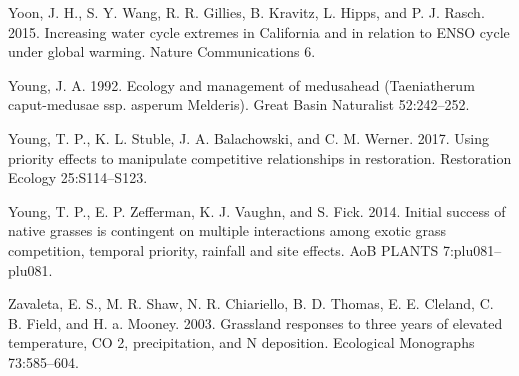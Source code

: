 \documentclass[twoside,12pt,final]{ucthesis-CA2012}
\begin{document}
\begin{ucmainmatter}
\leavevmode\hypertarget{ref-Yoon2015}{}%
Yoon, J. H., S. Y. Wang, R. R. Gillies, B. Kravitz, L. Hipps, and P. J. Rasch. 2015. Increasing water cycle extremes in California and in relation to ENSO cycle under global warming. Nature Communications 6.

\leavevmode\hypertarget{ref-Young1992}{}%
Young, J. A. 1992. Ecology and management of medusahead (Taeniatherum caput-medusae ssp. asperum Melderis). Great Basin Naturalist 52:242--252.

\leavevmode\hypertarget{ref-Young2017}{}%
Young, T. P., K. L. Stuble, J. A. Balachowski, and C. M. Werner. 2017. Using priority effects to manipulate competitive relationships in restoration. Restoration Ecology 25:S114--S123.

\leavevmode\hypertarget{ref-Young2014}{}%
Young, T. P., E. P. Zefferman, K. J. Vaughn, and S. Fick. 2014. Initial success of native grasses is contingent on multiple interactions among exotic grass competition, temporal priority, rainfall and site effects. AoB PLANTS 7:plu081--plu081.

\leavevmode\hypertarget{ref-Zavaleta2003}{}%
Zavaleta, E. S., M. R. Shaw, N. R. Chiariello, B. D. Thomas, E. E. Cleland, C. B. Field, and H. a. Mooney. 2003. Grassland responses to three years of elevated temperature, CO 2, precipitation, and N deposition. Ecological Monographs 73:585--604.

\end{ucmainmatter}
\end{document}

